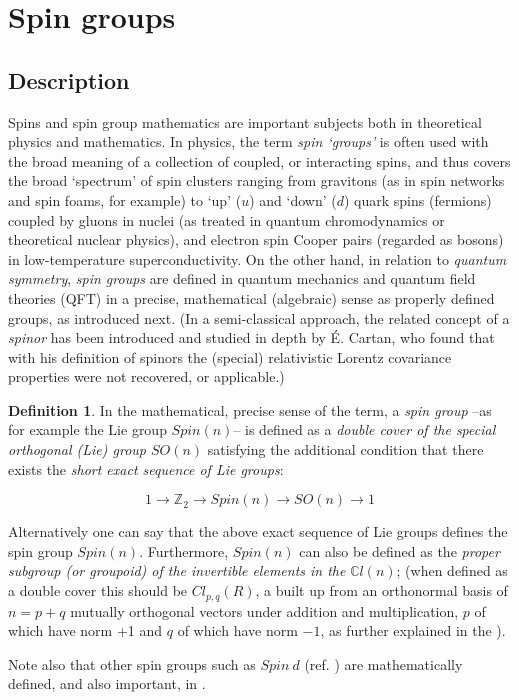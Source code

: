\documentclass[12pt]{article}
\theoremstyle{plain}
\theoremstyle{definition}
\newtheorem{definition}{Definition}[section]
\numberwithin{equation}{section}
\begin{document}
\section{Spin groups}
\subsection{Description}

Spins and spin group mathematics are important subjects both in theoretical physics and mathematics.
In physics, the term {\em spin `groups'} is often used with the broad meaning of a  
collection of coupled, or interacting spins, and thus covers the broad `spectrum' of spin clusters
ranging from gravitons (as in spin networks and spin foams, for example) to `up' ($u$) and `down' ($d$) quark spins
(fermions) coupled by gluons in nuclei (as treated in quantum chromodynamics or theoretical nuclear physics),
and electron spin Cooper pairs (regarded as bosons) in low-temperature superconductivity. 
On the other hand, in relation to \emph{quantum symmetry}, \emph{spin groups} are defined in 
quantum mechanics and quantum field theories (QFT) in a precise, mathematical (algebraic) sense as properly defined  
groups, as introduced next. (In a semi-classical approach, the related concept of a \emph{spinor} has been introduced and studied in depth by \'E. Cartan, who found that with his definition of spinors the (special) relativistic Lorentz covariance properties were not recovered, or applicable.)
\bigbreak
\begin{definition}
In the mathematical, precise sense of the term, a \emph{spin group}
--as for example the Lie group $Spin(n)$-- is defined as a \emph{double cover of the special orthogonal (Lie) group $SO(n)$} satisfying the additional condition that there exists the \emph{short exact sequence of Lie groups}:

$$ 1 \to \mathbb{Z}_2 \to Spin(n) \to SO(n) \to 1 $$

Alternatively one can say that the above exact sequence of Lie groups defines the spin group $Spin(n)$. 
Furthermore, \emph{$Spin(n)$} can also be defined as the \emph{proper subgroup (or groupoid) of the invertible elements
in the } $\mathbb{C}l(n)$; (when defined as a double cover this should be $Cl_{p, q}(R)$, a  built up from an orthonormal basis of $n = p + q$ mutually orthogonal vectors under addition and multiplication, $p$ of which have norm +1 and $q$ of which have norm $-1$, as further explained in the ). 

Note also that other spin groups such as \emph{$Spin ~ d$} (ref. \cite{SW1999}) are mathematically defined, and also important, in .  
\end{definition}
\end{document}
